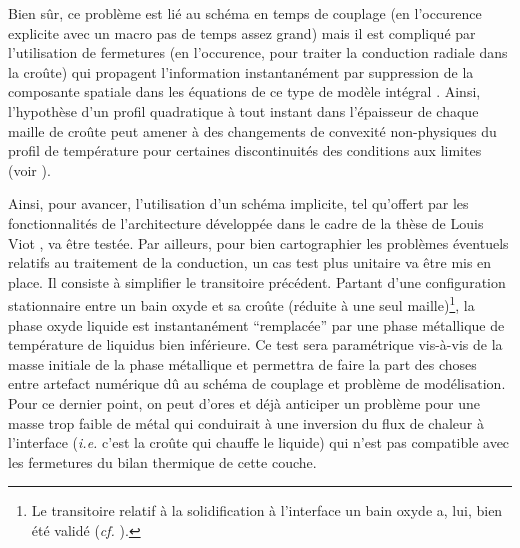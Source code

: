 Bien sûr, ce problème est lié au schéma en temps de couplage (en l'occurence explicite avec un macro pas de temps assez grand) mais il est compliqué par l'utilisation de fermetures (en l'occurence, pour traiter la conduction radiale dans la croûte) qui propagent l'information instantanément par suppression de la composante spatiale dans les équations de ce type de modèle intégral \cite{Viot2018}. Ainsi, l'hypothèse d'un profil quadratique à tout instant dans l'épaisseur de chaque maille de croûte peut amener à des changements de convexité non-physiques du profil de température pour certaines discontinuités des conditions aux limites (voir \cite{Peybernes2018}).

Ainsi, pour avancer, l'utilisation d'un schéma implicite, tel qu'offert par les fonctionnalités de l'architecture développée dans le cadre de la thèse de Louis Viot \cite{Viot2018}, va être testée. Par ailleurs, pour bien cartographier les problèmes éventuels relatifs au traitement de la conduction, un cas test plus unitaire va être mis en place. Il consiste à simplifier le transitoire précédent.
Partant d'une configuration stationnaire entre un bain oxyde et sa croûte (réduite à une seul maille)\footnote{Le transitoire relatif à la solidification à l'interface un bain oxyde a, lui, bien été validé (\textit{cf.} ).}, la phase oxyde liquide est instantanément ``remplacée'' par une phase métallique de température de liquidus bien inférieure. Ce test sera paramétrique vis-à-vis de la masse initiale de la phase métallique et permettra de faire la part des choses entre artefact numérique dû au schéma de couplage et problème de modélisation. Pour ce dernier point, on peut d'ores et déjà anticiper un problème pour une masse trop faible de métal qui conduirait à une inversion du flux de chaleur à l'interface (\textit{i.e.} c'est la croûte qui chauffe le liquide) qui n'est pas compatible avec les fermetures du bilan thermique de cette couche.
